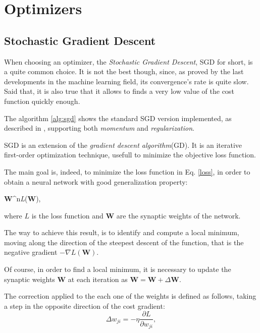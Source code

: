 \chapter{Optimizers} %
\label{cha:optimizers}
	\section{Stochastic Gradient Descent} %
	\label{sec:sgd}
		When choosing an optimizer, the \textit{Stochastic Gradient Descent}, SGD for short, is a quite common
		choice. It is not the best though, since, as proved by the last developments in the machine learning
		field, its convergence's rate is quite slow. 
		Said that, it is also true that it allows to finds a very low value of the cost function quickly enough. 

		The algorithm \ref{alg:sgd} shows the standard SGD version implemented, as described in
		\cite{Goodfellow-et-al-2016}, supporting both \textit{momentum} and \textit{regularization}.
		\cite{LIVIERIS2013491}

		SGD is an extension of the \textit{gradient descent algorithm}(GD). It is an iterative first-order optimization technique, usefull to minimize the objective loss function.

		The main goal is, indeed, to minimize the loss function in Eq. \ref{loss}, in order to obtain a neural network with good generalization property:

		\begin{mini}
		  {\textbf{W}\in {}^n}{\textit{L}(\textbf{W}),}{\label{minimization}}{}
		\end{mini}

		where $\textit{L}$ is the loss function and \textbf{W} are the synaptic weights of the network.

		The way to achieve this result, is to identify and compute a local minimum, moving along the direction of the steepest descent of the function, that is the negative gradient $-\nabla\textit{L}(\textbf{W})$.

		Of course, in order to find a local minimum, it is necessary to update the synaptic weights \textbf{W} at each iteration as $\textbf{W} = \textbf{W} +\Delta \textbf{W}$.

		The correction applied to the each one of the weights is defined as follows, taking a step in the opposite direction of the cost gradient:
		\begin{equation}
			\label{delta_rule}
			\Delta w_{ji} = -\eta \frac{\partial\textit{L}}{\partial w_{ji}},
		\end{equation}

